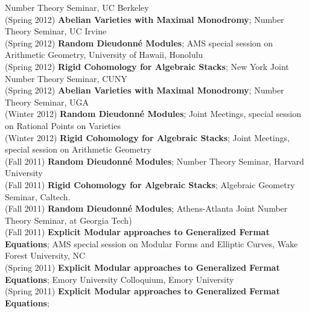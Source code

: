 \documentclass[margin,line]{res}
\begin{document}
\begin{resume}
Number Theory Seminar, UC Berkeley
\vspace{.05cm}\\
(Spring 2012) \textbf{Abelian Varieties with Maximal Monodromy};
Number Theory Seminar, UC Irvine
\vspace{.05cm}\\
(Spring 2012) \textbf{Random Dieudonn\'e Modules};
AMS special session on Arithmetic Geometry, University of Hawaii, Honolulu 
\vspace{.05cm}\\
(Spring 2012) \textbf{Rigid Cohomology for Algebraic Stacks};
New York Joint Number Theory Seminar, CUNY
\vspace{.05cm}\\
(Spring 2012) \textbf{Abelian Varieties with Maximal Monodromy};
Number Theory Seminar, UGA
\vspace{.05cm}\\
(Winter 2012) \textbf{Random Dieudonn\'e Modules};
Joint Meetings, special session on Rational Points on Varieties
\vspace{.05cm}\\
(Winter 2012) \textbf{Rigid Cohomology for Algebraic Stacks};
Joint Meetings, special session on Arithmetic Geometry
\vspace{.05cm}\\
(Fall 2011) \textbf{Random Dieudonn\'e Modules};
Number Theory Seminar, Harvard University
\vspace{.05cm}\\
(Fall 2011) \textbf{Rigid Cohomology for Algebraic Stacks};
Algebraic Geometry Seminar, Caltech.
\vspace{.05cm}\\
(Fall 2011) \textbf{Random Dieudonn\'e Modules};
Athens-Atlanta Joint Number Theory Seminar, at Georgia Tech)
\vspace{.05cm}\\
(Fall 2011) \textbf{Explicit Modular approaches to Generalized Fermat Equations};
AMS special session on Modular Forms and Elliptic Curves, Wake Forest University, NC
\vspace{.05cm}\\
(Spring 2011) \textbf{Explicit Modular approaches to Generalized Fermat Equations};
Emory University Colloquium, Emory University
\vspace{.05cm}\\
(Spring 2011) \textbf{Explicit Modular approaches to Generalized Fermat Equations};

\end{resume}
\end{document}
